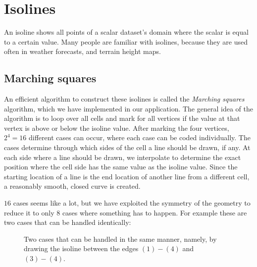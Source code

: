 \section{Isolines}
\label{sec:isolines}
An isoline shows all points of a scalar dataset's domain where the scalar is equal to a certain value.
Many people are familiar with isolines, because they are used often in weather forecasts, and terrain height maps.

\subsection{Marching squares}
An efficient algorithm to construct these isolines is called the \textit{Marching squares}\cite{maple2003geometric} algorithm, which we have implemented in our application.
The general idea of the algorithm is to loop over all cells and mark for all vertices if the value at that vertex is above or below the isoline value.
After marking the four vertices, \(2^4=16\) different cases can occur, where each case can be coded individually.
The cases determine through which sides of the cell a line should be drawn, if any.
At each side where a line should be drawn, we interpolate to determine the exact position where the cell side has the same value as the isoline value.
Since the starting location of a line is the end location of another line from a different cell, a reasonably smooth, closed curve is created.

\(16\) cases seems like a lot, but we have exploited the symmetry of the geometry to reduce it to only \(8\) cases where something has to happen.
For example these are two cases that can be handled identically:

\begin{figure}[htb]
    \centering
    \caption{Two cases that can be handled in the same manner, namely, by drawing the isoline between the edges \((1)-(4)\) and \((3)-(4)\).}
\end{figure}

